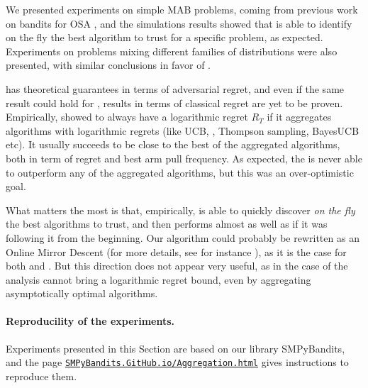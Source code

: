 %
We presented experiments on simple MAB problems, coming from previous work on bandits for OSA \cite{Jouini10},
and the simulations results showed that \Aggr{} is able to identify on the fly the best algorithm to trust for a specific problem, as expected.
Experiments on problems mixing different families of distributions were also presented, with similar conclusions in favor of \Aggr.

\ExpQ{} has theoretical guarantees in terms of adversarial regret, and even if the same result could hold for \Aggr, results in terms of classical regret are yet to be proven.
Empirically, \Aggr{} showed to always have a logarithmic
regret $R_T$ if it aggregates algorithms with logarithmic regrets (like UCB, \klUCB, Thompson sampling, BayesUCB etc).
It usually succeeds to be close to the best of the aggregated algorithms, both in term of regret and best arm pull frequency.
As expected, the \Aggr{} is never able to outperform any of the aggregated algorithms, but this was an over-optimistic goal.

What matters the most is that, empirically, \Aggr{} is able to quickly discover \emph{on the fly} the best algorithms to trust, and then performs almost as well as if it was following it from the beginning.
%
%
Our \Aggr{} algorithm could probably be rewritten as an Online Mirror Descent (for more details, see for instance \cite{Hazan2016introduction,Zimmert2018}), as it is the case for both \ExpQ{} and \CORRAL.
But this direction does not appear very useful, as in the case of \CORRAL{}  the analysis cannot bring a logarithmic regret bound, even by aggregating asymptotically optimal algorithms.


\paragraph{Reproducility of the experiments.}
%
Experiments presented in this Section are based on our library SMPyBandits,
and the page \href{https://SMPyBandits.GitHub.io/Aggregation.html}{\texttt{SMPyBandits.GitHub.io/Aggregation.html}} gives instructions to reproduce them.
